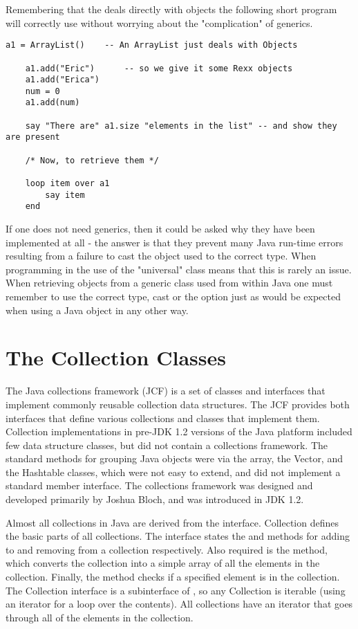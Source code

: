 {Remembering that the  deals directly with objects the following short \nr{} program will correctly use  without worrying about the "complication" of generics.

\begin{lstlisting}[label=ArrayListExample, caption=ArrayList Example]
	a1 = ArrayList()	-- An ArrayList just deals with Objects

	a1.add("Eric")		-- so we give it some Rexx objects
	a1.add("Erica")
	num = 0
	a1.add(num)

	say "There are" a1.size "elements in the list" -- and show they are present

	/* Now, to retrieve them */

	loop item over a1
		say item
	end
\end{lstlisting}

If one does not need generics, then it could be asked why they have been implemented at all - the answer is that they prevent many Java run-time errors resulting from a failure to cast the object used to the correct type. When programming in \nr{} the use of the "universal"  class means that this is rarely an issue. When retrieving objects from a generic class used from within Java one must remember to use the correct type, cast or the  option just as would be expected when using a Java object in any other way.


\section{The Collection Classes}
The Java collections framework (JCF) is a set of classes and interfaces that implement commonly reusable collection data structures.
The JCF provides both interfaces that define various
collections and classes that implement them. Collection
implementations in pre-JDK 1.2 versions of the Java platform included
few data structure classes, but did not contain a collections
framework. The standard methods for grouping Java objects were via the array, the Vector, and the Hashtable classes, which were not easy to extend, and did not implement a standard member interface.
The collections framework was designed and developed primarily by
Joshua Bloch, and was introduced in JDK 1.2.

Almost all collections in Java are derived from the
 interface. Collection defines the basic parts of
all collections. The interface states the  and  methods
for adding to and removing from a collection respectively. Also
required is the  method, which converts the collection into a
simple array of all the elements in the collection. Finally, the
 method checks if a specified element is in the
collection. The Collection interface is a subinterface of
, so any Collection is iterable (using an
iterator for a loop over the contents).
All collections have an iterator that goes
through all of the elements in the collection.

}
